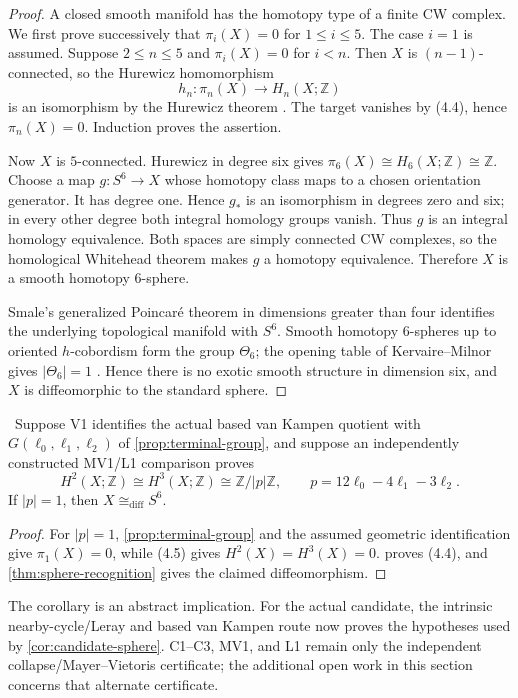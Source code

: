 \begin{proof}
A closed smooth manifold has the homotopy type of a finite CW complex.
We first prove successively that $\pi_i(X)=0$ for $1\le i\le5$.
The case $i=1$ is assumed.  Suppose $2\le n\le5$ and
$\pi_i(X)=0$ for $i<n$.  Then $X$ is $(n-1)$-connected, so the Hurewicz
homomorphism
\[
h_n:\pi_n(X)\longrightarrow H_n(X;\mathbb Z)
\]
is an isomorphism by the Hurewicz theorem
\cite[Theorem~4.32]{Hatcher2002}.  The target vanishes by (4.4), hence
$\pi_n(X)=0$.  Induction proves the assertion.

Now $X$ is $5$-connected.  Hurewicz in degree six gives
$\pi_6(X)\cong H_6(X;\mathbb Z)\cong\mathbb Z$.  Choose a map
$g:S^6\to X$ whose homotopy class maps to a chosen orientation generator.
It has degree one.  Hence $g_*$ is an isomorphism in degrees zero and six;
in every other degree both integral homology groups vanish.  Thus $g$ is an
integral homology equivalence.  Both spaces are simply connected CW
complexes, so the homological Whitehead theorem
\cite[Corollary~4.33]{Hatcher2002} makes $g$ a homotopy equivalence.
Therefore $X$ is a smooth homotopy $6$-sphere.

Smale's generalized Poincar\'e theorem in dimensions greater than four
\cite[Theorem~A]{Smale1961} identifies the underlying topological manifold
with $S^6$.  Smooth homotopy $6$-spheres up to oriented
$h$-cobordism form the group $\Theta_6$; the opening table of
Kervaire--Milnor gives $|\Theta_6|=1$
\cite{KervaireMilnor1963}.  Hence there is no exotic smooth structure in
dimension six, and $X$ is diffeomorphic to the standard sphere.
\end{proof}

\begin{corollary}\label{cor:conditional-s6}
\Conditional\ Suppose V1 identifies the actual based van Kampen quotient
with $G(\ell_0,\ell_1,\ell_2)$ of
\cref{prop:terminal-group}, and suppose an independently constructed
MV1/L1 comparison proves
\[
H^2(X;\mathbb Z)\cong H^3(X;\mathbb Z)
\cong\mathbb Z/|p|\mathbb Z,
\qquad p=12\ell_0-4\ell_1-3\ell_2.
\tag{4.5}
\]
If $|p|=1$, then $X\cong_{\mathrm{diff}}S^6$.
\end{corollary}

\begin{proof}
For $|p|=1$, 
\cref{prop:terminal-group} and the assumed geometric identification give
$\pi_1(X)=0$, while (4.5) gives $H^2(X)=H^3(X)=0$.
 proves (4.4), and
\cref{thm:sphere-recognition} gives the claimed diffeomorphism.
\end{proof}

The corollary is an abstract implication.  For the actual candidate, the
intrinsic nearby-cycle/Leray and based van Kampen route now proves the
hypotheses used by \cref{cor:candidate-sphere}.  C1--C3, MV1, and L1 remain
only the independent collapse/Mayer--Vietoris certificate; the additional open
work in this section concerns that alternate certificate.
